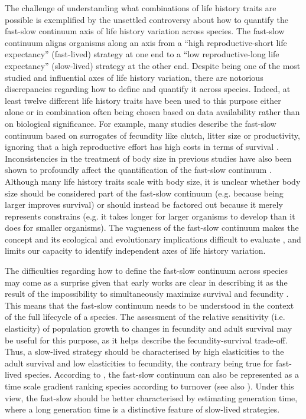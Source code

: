 The challenge of understanding what combinations of life history traits are
possible is exemplified by the unsettled controversy about how to quantify the
fast-slow continuum axis of life history variation across species. The fast-slow
continuum aligns organisms along an axis from a “high reproductive-short life
expectancy” (fast-lived) strategy at one end to a “low reproductive-long life
expectancy” (slow-lived) strategy at the other end. Despite being one of the
most studied and influential axes of life history variation, there are notorious
discrepancies regarding how to define and quantify it across species. Indeed, at
least twelve different life history traits have been used to this purpose either
alone or in combination
often being chosen based on data availability rather than on biological
significance. For example, many studies describe the fast-slow continuum based
on surrogates of fecundity like clutch, litter size or productivity, ignoring
that a high reproductive effort has high costs in terms of survival
\citep{Adler2014}. Inconsistencies in the treatment of body size in previous
studies have also been shown to profoundly affect the quantification of the
fast-slow continuum \citep{Jeschke2009}.
Although many life history traits scale with body size, it is unclear whether
body size should be considered part of the fast-slow continuum (e.g. because
being larger improves survival) or should instead be factored out because it
merely represents constrains (e.g. it takes longer for larger organisms to
develop than it does for smaller organisms). The vagueness of the fast-slow
continuum makes the concept and its ecological and evolutionary implications
difficult to evaluate \citep{Jeschke2009}, and limits our capacity to identify
independent axes of life history variation.

The difficulties regarding how to define the fast-slow continuum across species
may come as a surprise given that early works are clear in describing it as the
result of the impossibility to simultaneously maximize survival and fecundity
\citep{Stearns1983a, Saether1988}. This means that the fast-slow continuum needs
to be understood in the context of the full lifecycle of a species. The
assessment of the relative sensitivity (i.e. elasticity) of population growth to
changes in fecundity and adult survival may be useful for this purpose, as it
helps describe the fecundity-survival trade-off. Thus, a slow-lived strategy
should be characterised by high elasticities to the adult survival and low
elasticities to fecundity, the contrary being true for fast-lived species.
According to \citet{Gaillard1989}, the fast-slow continuum can also be 
represented as a time scale gradient ranking species according to turnover (see 
also \citet{Jeschke2009,Saether2013,Adler2014}⁠). Under this view, the
fast-slow should be better characterised by estimating generation time, where a 
long generation time is a distinctive feature of slow-lived strategies.

